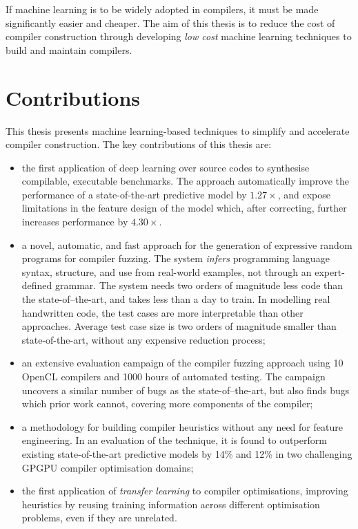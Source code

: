If machine learning is to be widely adopted in compilers, it must be made significantly easier and cheaper. The aim of this thesis is to reduce the cost of compiler construction through developing \emph{low cost} machine learning techniques to build and maintain compilers.


\section{Contributions}

This thesis presents machine learning-based techniques to simplify and accelerate compiler construction. The key contributions of this thesis are:

\begin{itemize}
  \item the first application of deep learning over source codes to synthesise compilable, executable benchmarks. The approach automatically improve the performance of a state-of-the-art predictive model by $1.27\times$, and expose limitations in the feature design of the model which, after correcting, further increases performance by $4.30\times$.
  \item a novel, automatic, and fast approach for the generation of expressive random programs for compiler fuzzing. The system \emph{infers} programming language syntax, structure, and use from real-world examples, not through an expert-defined grammar. The system needs two orders of magnitude less code than the state-of–the-art, and takes less than a day to train. In modelling real handwritten code, the test cases are more interpretable than other approaches. Average test case size is two orders of magnitude smaller than state-of-the-art, without any expensive reduction process;
  \item an extensive evaluation campaign of the compiler fuzzing approach using 10 OpenCL compilers and 1000 hours of automated testing. The campaign uncovers a similar number of bugs as the state-of–the-art, but also finds bugs which prior work cannot, covering more components of the compiler;
	\item a methodology for building compiler heuristics without any need for feature engineering. In an evaluation of the technique, it is found to outperform existing state-of-the-art predictive models by 14\% and 12\% in two challenging GPGPU compiler optimisation domains;
	\item the first application of \emph{transfer learning} to compiler optimisations, improving heuristics by reusing training information across different optimisation problems, even if they are unrelated.
\end{itemize}


